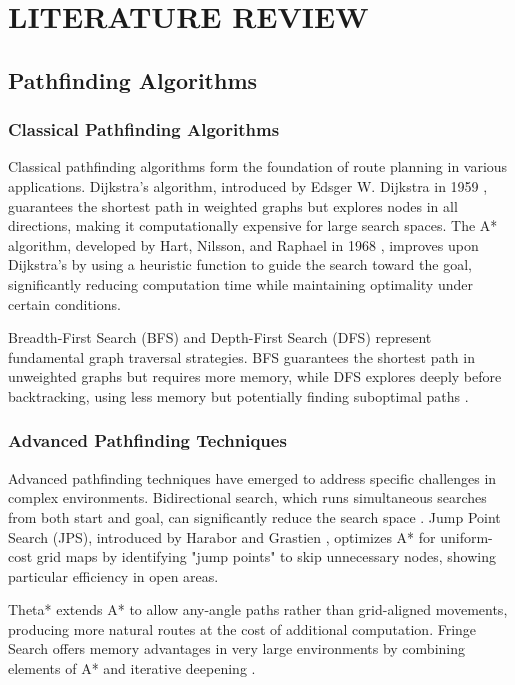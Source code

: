 \documentclass[11pt,a4paper]{report}
\begin{document}
\chapter{LITERATURE REVIEW}

\section{Pathfinding Algorithms}

\subsection{Classical Pathfinding Algorithms}
Classical pathfinding algorithms form the foundation of route planning in various applications. Dijkstra's algorithm, introduced by Edsger W. Dijkstra in 1959 \cite{dijkstra1959note}, guarantees the shortest path in weighted graphs but explores nodes in all directions, making it computationally expensive for large search spaces. The A* algorithm, developed by Hart, Nilsson, and Raphael in 1968 \cite{hart1968formal}, improves upon Dijkstra's by using a heuristic function to guide the search toward the goal, significantly reducing computation time while maintaining optimality under certain conditions.

Breadth-First Search (BFS) and Depth-First Search (DFS) represent fundamental graph traversal strategies. BFS guarantees the shortest path in unweighted graphs but requires more memory, while DFS explores deeply before backtracking, using less memory but potentially finding suboptimal paths \cite{cormen2009introduction}.

\subsection{Advanced Pathfinding Techniques}
Advanced pathfinding techniques have emerged to address specific challenges in complex environments. Bidirectional search, which runs simultaneous searches from both start and goal, can significantly reduce the search space \cite{pohl1971bi}. Jump Point Search (JPS), introduced by Harabor and Grastien \cite{harabor2011online}, optimizes A* for uniform-cost grid maps by identifying "jump points" to skip unnecessary nodes, showing particular efficiency in open areas.

Theta* \cite{nash2007theta} extends A* to allow any-angle paths rather than grid-aligned movements, producing more natural routes at the cost of additional computation. Fringe Search offers memory advantages in very large environments by combining elements of A* and iterative deepening \cite{bjornsson2005fringe}.
\end{document}
